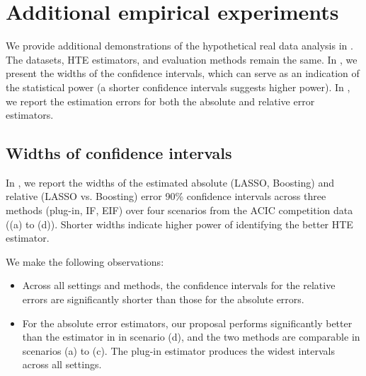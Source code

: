 



\section{Additional empirical experiments}\label{appe:sec:simulation.additional}
We provide additional demonstrations of the hypothetical real data analysis in . The datasets, HTE estimators, and evaluation methods remain the same. 
In , we present the widths of the confidence intervals, which can serve as an indication of the statistical power (a shorter confidence intervals suggests higher power). 
In , we report the estimation errors for both the absolute and relative error estimators.


\subsection{Widths of confidence intervals}\label{appe:sec:simulation.width}

In , we report the widths of the estimated absolute (LASSO, Boosting) and relative (LASSO vs. Boosting) error 90\% confidence intervals across three methods (plug-in, IF, EIF) over four scenarios from the ACIC competition data ((a) to (d)).
Shorter widths indicate higher power of identifying the better HTE estimator.


We make the following observations:
\begin{itemize}
    \item Across all settings and methods, the confidence intervals for the relative errors are significantly shorter than those for the absolute errors.
    \item For the absolute error estimators, our proposal performs significantly better than the estimator in \cite{alaa2019validating} in scenario (d), and the two methods are comparable in scenarios (a) to (c). The plug-in estimator produces the widest intervals across all settings.
\end{itemize}


